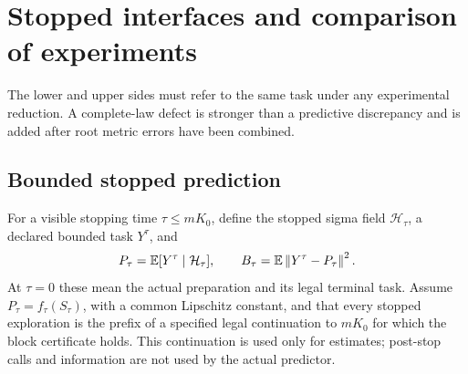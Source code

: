 \section{Stopped interfaces and comparison of experiments}\label{sec:composition}
The lower and upper sides must refer to the same task under any experimental reduction. A complete-law defect is stronger than a predictive discrepancy and is added after root metric errors have been combined.

\subsection{Bounded stopped prediction}
For a visible stopping time $\tau\le mK_0$, define the stopped sigma field $\mathcal H_\tau$, a declared bounded task $Y^\tau$, and
\[
 P_\tau=\mathbb E[Y^\tau\mid\mathcal H_\tau],\qquad
 B_\tau=\mathbb E\left\lVert Y^\tau-P_\tau\right\rVert^2.
\]
At $\tau=0$ these mean the actual preparation and its legal terminal task. Assume $P_\tau=f_\tau(S_\tau)$, with a common Lipschitz constant, and that every stopped exploration is the prefix of a specified legal continuation to $mK_0$ for which the block certificate holds. This continuation is used only for estimates; post-stop calls and information are not used by the actual predictor.

